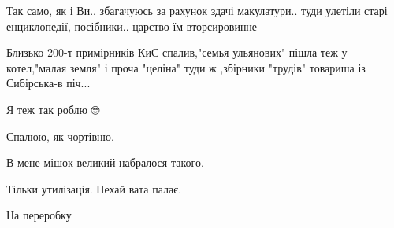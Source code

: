 \begin{itemize}
Так само, як і Ви.. збагачуюсь за рахунок здачі макулатури.. туди улетіли старі
енциклопедії, посібники.. царство їм вторсировинне

 
Близько 200-т примірників КиС спалив,"семья ульянових" пішла теж у котел,"малая земля" і проча "целіна" туди ж ,збірники "трудів" товариша із Сибірська-в піч...

 
Я теж так роблю 🤓

 
Спалюю, як чортівню.

 
В мене мішок великий набралося такого.

 
Тільки утилізація. Нехай вата палає.

 
На переробку

 

\end{itemize}
